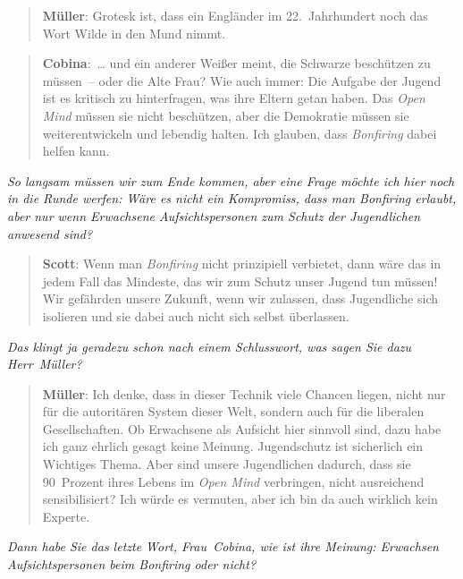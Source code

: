 \documentclass{scrartcl}
\newenvironment{frage}{\itshape}{}
\newenvironment{antworta}{
  \begin{quotation}
  }{
  \end{quotation}
}
\newenvironment{antwortb}{
  \begin{quotation}
  }{
  \end{quotation}
}
\newcommand{\name}[1]{\textbf{#1}}
\begin{document}
\begin{antwortb}
\name{Müller}: Grotesk ist, dass ein Engländer im 22.~Jahrhundert
noch das Wort Wilde in den Mund nimmt.
\end{antwortb}


\begin{antworta}
\name{Cobina}:~… und ein anderer Weißer meint, die Schwarze
beschützen zu müssen~– oder die Alte Frau? Wie auch immer:
Die Aufgabe der Jugend ist es kritisch zu hinterfragen, was
ihre Eltern getan haben. Das \emph{Open Mind} müssen sie nicht
beschützen, aber die Demokratie müssen sie weiterentwickeln
und lebendig halten. Ich glauben, dass \emph{Bonfiring} dabei
helfen kann.
\end{antworta}


\begin{frage}
So langsam müssen wir zum Ende kommen, aber eine Frage
möchte ich hier noch in die Runde werfen: Wäre es nicht ein
Kompromiss, dass man \emph{Bonfiring} erlaubt, aber nur wenn
Erwachsene Aufsichtspersonen zum Schutz der Jugendlichen
anwesend sind?
\end{frage}


\begin{antworta}
\name{Scott}: Wenn man \emph{Bonfiring} nicht prinzipiell verbietet, dann
wäre das in jedem Fall das Mindeste, das wir zum Schutz
unser Jugend tun müssen! Wir gefährden unsere Zukunft, wenn
wir zulassen, dass Jugendliche sich isolieren und sie dabei
auch nicht sich selbst überlassen.
\end{antworta}


\begin{frage}
Das klingt ja geradezu schon nach einem Schlusswort, was
sagen Sie dazu Herr~Müller?
\end{frage}


\begin{antworta}
\name{Müller}: Ich denke, dass in dieser Technik viele Chancen
liegen, nicht nur für die autoritären System dieser Welt,
sondern auch für die liberalen Gesellschaften. Ob Erwachsene
als Aufsicht hier sinnvoll sind, dazu habe ich ganz ehrlich
gesagt keine Meinung. Jugendschutz ist sicherlich ein
Wichtiges Thema. Aber sind unsere Jugendlichen dadurch, dass
sie 90~Prozent ihres Lebens im \emph{Open Mind} verbringen, nicht
ausreichend sensibilisiert? Ich würde es vermuten, aber ich
bin da auch wirklich kein Experte.
\end{antworta}


\begin{frage}
Dann habe Sie das letzte Wort, Frau~Cobina, wie ist ihre
Meinung: Erwachsen Aufsichtspersonen beim \emph{Bonfiring} oder nicht?
\end{frage}
\end{document}
